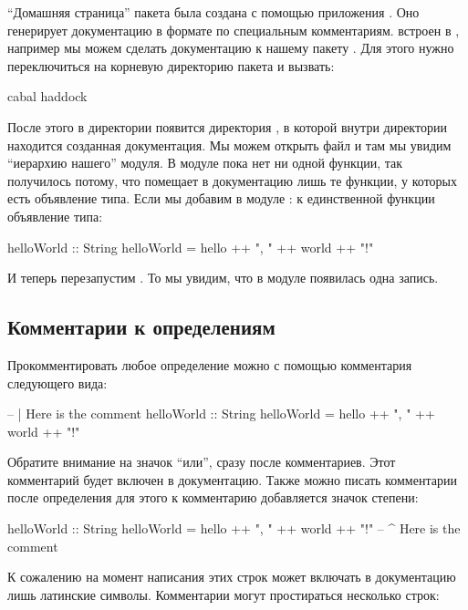 ``Домашняя страница'' пакета была создана с помощью приложения
. Оно генерирует документацию в формате  по
специальным комментариям.  встроен в , например мы
можем сделать документацию к нашему пакету . Для этого нужно
переключиться на корневую директорию пакета и вызвать:


\begin{code}
cabal haddock
\end{code}

После этого в директории  появится директория , в
которой внутри директории  находится созданная документация. Мы
можем открыть файл  и там мы увидим ``иерархию нашего''
модуля. В модуле пока нет ни одной функции, так получилось потому, что
 помещает в документацию лишь те функции, у которых есть
объявление типа. Если мы добавим в модуле : к единственной
функции объявление типа:


\begin{code}
helloWorld :: String
helloWorld = hello ++ ", " ++ world ++ "!"
\end{code}

И теперь перезапустим . То мы увидим, что в модуле
 появилась одна запись.

\subsection{Комментарии к определениям}

Прокомментировать любое определение можно с помощью комментария
следующего вида:


\begin{code}
-- | Here is the comment
helloWorld :: String
helloWorld = hello ++ ", " ++ world ++ "!"
\end{code}

Обратите внимание на значок ``или'', сразу после комментариев. Этот
комментарий будет включен в документацию. Также можно писать комментарии
после определения для этого к комментарию добавляется значок степени:


\begin{code}
helloWorld :: String
helloWorld = hello ++ ", " ++ world ++ "!"
-- ^ Here is the comment
\end{code}

К сожалению на момент написания этих строк  может включать в
документацию лишь латинские символы. Комментарии могут простираться
несколько строк:


